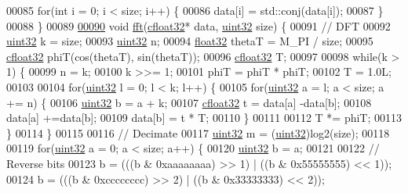 \begin{DoxyCode}
00085         \textcolor{keywordflow}{for}(\textcolor{keywordtype}{int} i = 0; i < size; i++) \{
00086             data[i] = std::conj(data[i]);
00087         \}
00088     \}
00089 
\hypertarget{zdomain_8hpp_source_l00090}{}\hyperlink{namespaceradio_ab146b5bf7f1c005939b024c9c4910a77}{00090}     \textcolor{keywordtype}{void} \hyperlink{namespaceradio_ab146b5bf7f1c005939b024c9c4910a77}{fft}(\hyperlink{definitions_8hpp_a960be6b6614c08090c16574dba10a421}{cfloat32}* data, \hyperlink{definitions_8hpp_a1134b580f8da4de94ca6b1de4d37975e}{uint32} size) \{
00091         \textcolor{comment}{// DFT}
00092         \hyperlink{definitions_8hpp_a1134b580f8da4de94ca6b1de4d37975e}{uint32} k = size;
00093         \hyperlink{definitions_8hpp_a1134b580f8da4de94ca6b1de4d37975e}{uint32} n;
00094         \hyperlink{definitions_8hpp_aacdc525d6f7bddb3ae95d5c311bd06a1}{float32} thetaT = M\_PI / size;
00095         \hyperlink{definitions_8hpp_a960be6b6614c08090c16574dba10a421}{cfloat32} phiT(cos(thetaT), sin(thetaT));
00096         \hyperlink{definitions_8hpp_a960be6b6614c08090c16574dba10a421}{cfloat32} T;
00097 
00098         \textcolor{keywordflow}{while}(k > 1) \{
00099             n = k;
00100             k >>= 1;
00101             phiT = phiT * phiT;
00102             T = 1.0L;
00103 
00104             \textcolor{keywordflow}{for}(\hyperlink{definitions_8hpp_a1134b580f8da4de94ca6b1de4d37975e}{uint32} l = 0; l < k; l++) \{
00105                 \textcolor{keywordflow}{for}(\hyperlink{definitions_8hpp_a1134b580f8da4de94ca6b1de4d37975e}{uint32} a = l; a < size; a += n) \{
00106                     \hyperlink{definitions_8hpp_a1134b580f8da4de94ca6b1de4d37975e}{uint32} b = a + k;
00107                     \hyperlink{definitions_8hpp_a960be6b6614c08090c16574dba10a421}{cfloat32} t = data[a] -data[b];
00108                     data[a] +=data[b];
00109                     data[b] = t * T;
00110                 \}
00111 
00112                 T *= phiT;
00113             \}
00114         \}
00115 
00116         \textcolor{comment}{// Decimate}
00117         \hyperlink{definitions_8hpp_a1134b580f8da4de94ca6b1de4d37975e}{uint32} m = (\hyperlink{definitions_8hpp_a1134b580f8da4de94ca6b1de4d37975e}{uint32})log2(size);
00118 
00119         \textcolor{keywordflow}{for}(\hyperlink{definitions_8hpp_a1134b580f8da4de94ca6b1de4d37975e}{uint32} a = 0; a < size; a++) \{
00120             \hyperlink{definitions_8hpp_a1134b580f8da4de94ca6b1de4d37975e}{uint32} b = a;
00121 
00122             \textcolor{comment}{// Reverse bits}
00123             b = (((b & 0xaaaaaaaa) >> 1) | ((b & 0x55555555) << 1));
00124             b = (((b & 0xcccccccc) >> 2) | ((b & 0x33333333) << 2));

\end{DoxyCode}
